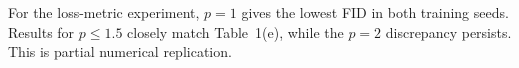 For the loss-metric experiment, $p=1$ gives the lowest FID in both training seeds. Results for $p\leq1.5$ closely match Table~1(e), while the $p=2$ discrepancy persists. This is partial numerical replication.
